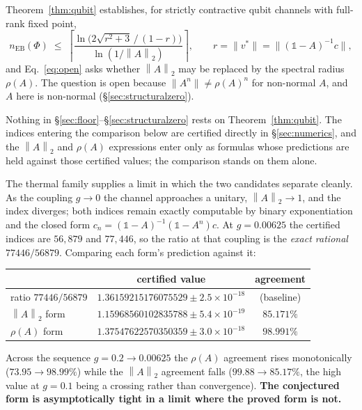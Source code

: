 \documentclass[11pt,a4paper]{article}
\theoremstyle{definition}
\theoremstyle{remark}
\newcommand{\I}{\mathbb{1}}
\newcommand{\nEB}{n_{\mathrm{EB}}}
\newcommand{\opn}[1]{\left\lVert #1 \right\rVert_{2}}
\begin{document}
Theorem~\ref{thm:qubit} establishes, for strictly contractive qubit channels with full-rank fixed point,
\begin{equation}\label{eq:pIIbound}
  \nEB(\Phi) \;\le\; \left\lceil \frac{\ln\!\big(2\sqrt{r^2+3}\,/\,(1-r)\big)}{\ln(1/\opn{A})} \right\rceil,
  \qquad r = \lVert v^*\rVert = \lVert(\I-A)^{-1}c\rVert,
\end{equation}
and Eq.~\eqref{eq:open} asks whether $\opn{A}$ may be replaced by the spectral radius $\rho(A)$. The question is open because $\lVert A^n\rVert \neq \rho(A)^n$ for non-normal $A$, and $A$ here is non-normal (\S\ref{sec:structuralzero}).

Nothing in \S\ref{sec:floor}--\S\ref{sec:structuralzero} rests on Theorem~\ref{thm:qubit}. The indices entering the comparison below are certified directly in \S\ref{sec:numerics}, and the $\opn{A}$ and $\rho(A)$ expressions enter only as formulas whose predictions are held against those certified values; the comparison stands on them alone.

The thermal family supplies a limit in which the two candidates separate cleanly. As the coupling $g \to 0$ the channel approaches a unitary, $\opn{A} \to 1$, and the index diverges; both indices remain exactly computable by binary exponentiation and the closed form $c_n = (\I-A)^{-1}(\I-A^n)c$. At $g = 0.00625$ the certified indices are $56{,}879$ and $77{,}446$, so the ratio at that coupling is the \emph{exact rational} $77446/56879$. Comparing each form's prediction against it:

\begin{center}
\begin{tabular}{lcc}
\toprule
 & certified value & agreement\\
\midrule
ratio $77446/56879$ & $1.36159215176075529 \pm 2.5\times10^{-18}$ & (baseline)\\
$\opn{A}$ form & $1.15968560102835788 \pm 5.4\times10^{-19}$ & $85.171\%$\\
$\rho(A)$ form & $1.37547622570350359 \pm 3.0\times10^{-18}$ & $\mathbf{98.991\%}$\\
\bottomrule
\end{tabular}
\end{center}

Across the sequence $g = 0.2 \to 0.00625$ the $\rho(A)$ agreement rises monotonically ($73.95 \to 98.99\%$) while the $\opn{A}$ agreement falls ($99.88 \to 85.17\%$, the high value at $g=0.1$ being a crossing rather than convergence). \textbf{The conjectured form is asymptotically tight in a limit where the proved form is not.}
\end{document}
